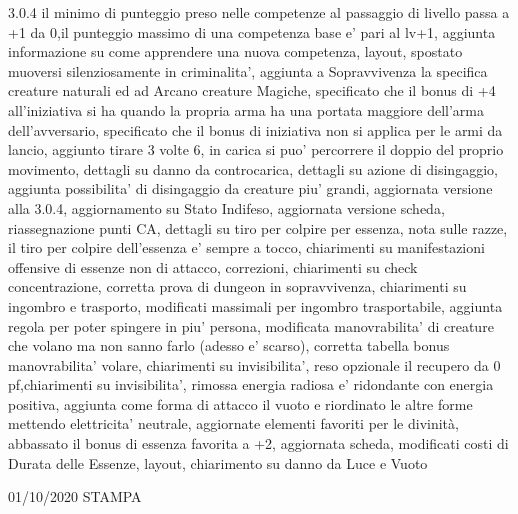 \documentclass[a4paper,11pt,twoside,openany]{book}
\begin{document}
{{	3.0.4 il minimo di punteggio preso nelle competenze al passaggio di livello passa a +1 da 0,il punteggio massimo di una competenza base e' pari al lv+1, aggiunta informazione su come apprendere una nuova competenza, layout, spostato muoversi silenziosamente in criminalita', aggiunta a Sopravvivenza la specifica creature naturali ed ad Arcano creature Magiche, specificato che il bonus di +4 all'iniziativa si ha quando la propria arma ha una portata maggiore dell'arma dell'avversario, specificato che il bonus di iniziativa non si applica per le armi da lancio, aggiunto tirare 3 volte 6, in carica si puo' percorrere il doppio del proprio movimento, dettagli su danno da controcarica, dettagli su azione di disingaggio, aggiunta possibilita' di disingaggio da creature piu' grandi, aggiornata versione alla 3.0.4, aggiornamento su Stato Indifeso, aggiornata versione scheda, riassegnazione punti CA, dettagli su tiro per colpire per essenza, nota sulle razze, il tiro per colpire dell'essenza e' sempre a tocco, chiarimenti su manifestazioni offensive di essenze non di attacco, correzioni, chiarimenti su check concentrazione, corretta prova di dungeon in sopravvivenza, chiarimenti su ingombro e trasporto, modificati massimali per ingombro trasportabile, aggiunta regola per poter spingere in piu' persona, modificata manovrabilita' di creature che volano ma non sanno farlo (adesso e' scarso), corretta tabella bonus manovrabilita' volare, chiarimenti su invisibilita', reso opzionale il recupero da 0 pf,chiarimenti su invisibilita', rimossa energia radiosa e' ridondante con energia positiva, aggiunta come forma di attacco il vuoto e riordinato le altre forme mettendo elettricita' neutrale, aggiornate elementi favoriti per le divinità, abbassato il bonus di essenza favorita a +2, aggiornata scheda, modificati costi di Durata delle Essenze, layout, chiarimento su danno da Luce e Vuoto

	01/10/2020 STAMPA
	
}}
\end{document}

